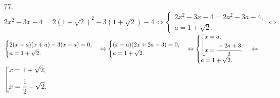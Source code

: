 77. $2x^2-3x-4=2(1+\sqrt{2})^2-3(1+\sqrt{2})-4\Leftrightarrow\begin{cases}2x^2-3x-4=2a^2-3a-4,\\ a=1+\sqrt{2}.\end{cases}
\Leftrightarrow$\\$\begin{cases}2(x-a)(x+a)-3(x-a)=0,\\ a=1+\sqrt{2}.\end{cases}
\Leftrightarrow\begin{cases}(x-a)(2x+2a-3)=0,\\ a=1+\sqrt{2}.\end{cases}
\Leftrightarrow \begin{cases}\left[\begin{gathered}
     x=a,\hfill\\
     x=\cfrac{-2a+3}{2}.\hfill \end{gathered}\right.\\ a=1+\sqrt{2}.\end{cases}\Leftrightarrow$\\$
\left[\begin{gathered}
     x=1+\sqrt{2},\hfill\\
     x=\cfrac{1}{2}-\sqrt{2}.\hfill \end{gathered}\right.$\\
